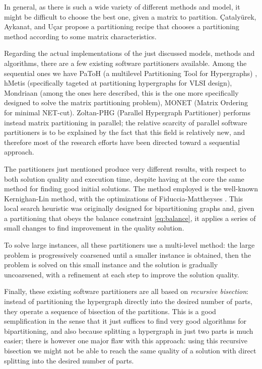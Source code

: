 In general, as there is such a wide variety of different methods and model, it might be difficult to choose the best one, given a matrix to partition. {\c{C}}ataly{\"u}rek, Aykanat, and U{\c{c}}ar propose a partitioning recipe \cite{catalyurek_recipe} that chooses a partitioning method according to some matrix characteristics.

Regarding the actual implementations of the just discussed models, methods and algorithms, there are a few existing software partitioners available. Among the sequential ones we have PaToH (a multilevel Partitioning Tool for Hypergraphs) \cite{patoh}, hMetis \cite{hmetis} (specifically tageted at partitioning hypergraphs for VLSI design), Mondriaan \cite{mondriaan} (among the ones here described, this is the one more specifically designed to solve the matrix partitioning problem), MONET (Matrix Ordering for minimal NET-cut)\cite{hu2000}. Zoltan-PHG (Parallel Hypergraph Partitioner) \cite{parallel_hypergraph} performs instead matrix partitioning in parallel; the relative scarcity of parallel software partitioners is to be explained by the fact that this field is relatively new, and therefore most of the research efforts have been directed toward a sequential approach.

The partitioners just mentioned produce very different results, with respect to both solution quality and execution time, despite having at the core the same method for finding good initial solutions. The method employed is the well-known Kernighan-Lin \cite{kernighan_lin} method, with the optimizations of Fiduccia-Mattheyses \cite{fiduccia}. This local search heuristic was originally designed for bipartitioning graphs and, given a partitioning that obeys the balance constraint \eqref{eq:balance}, it applies a series of small changes to find improvement in the quality solution.

To solve large instances, all these partitioners use a multi-level method: the large problem is progressively coarsened until a smaller instance is obtained, then the problem is solved on this small instance and the solution is gradually uncoarsened, with a refinement at each step to improve the solution quality.

Finally, these existing software partitioners are all based on \emph{recursive bisection}: instead of partitioning the hypergraph directly into the desired number of parts, they operate a sequence of bisection of the partitions. This is a good semplification in the sense that it just suffices to find very good algorithms for bipartitioning, and also because splitting a hypergraph in just two parts is much easier; there is however one major flaw with this approach: using this recursive bisection  we might not be able to reach the same quality of a solution with direct splitting into the desired number of parts.


